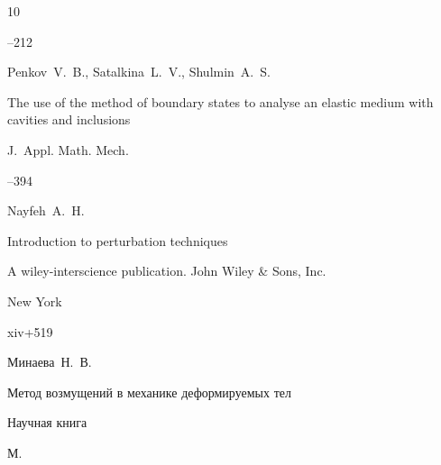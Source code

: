 \begin{thebibliography}{10}



--212





\by Penkov~V.~B., Satalkina~L.~V., Shulmin~A.~S.

\paper The use of the method of boundary states to analyse an elastic medium with cavities and inclusions

\jour  J.~Appl. Math. Mech.




--394








\by Nayfeh~A.~H.

\book Introduction to perturbation techniques


\publ A wiley-interscience publication. John Wiley \& Sons, Inc.

\publaddr New York

\totalpages xiv+519






\by Минаева~Н.~В.

\book Метод возмущений в механике деформируемых тел


\publ Научная книга

\publaddr М.













\end{thebibliography}
